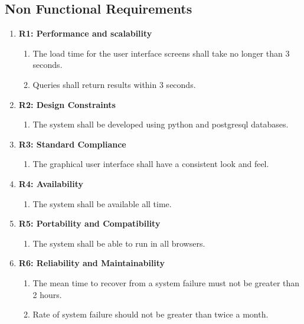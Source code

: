 \subsection{Non Functional Requirements}
\begin{enumerate}[font=\bfseries]
    \item \textbf{R1: Performance and scalability}
          \begin{enumerate}
              \item The load time for the user interface screens shall take no longer than 3 seconds.
              \item Queries shall return results within 3 seconds.
          \end{enumerate}
    \item \textbf{R2: Design Constraints}
          \begin{enumerate}
              \item The system shall be developed using python and postgresql databases.
          \end{enumerate}
    \item \textbf{R3: Standard Compliance}
          \begin{enumerate}
              \item The graphical user interface shall have a consistent look and feel.
          \end{enumerate}
    \item \textbf{R4: Availability}
          \begin{enumerate}
              \item The system shall be available all time.
          \end{enumerate}
    \item \textbf{R5: Portability and Compatibility}
          \begin{enumerate}
              \item The system shall be able to run in all browsers.
          \end{enumerate}
    \item \textbf{R6: Reliability and Maintainability}
          \begin{enumerate}
              \item The mean time to recover from a system failure must not be greater than 2 hours.
              \item Rate of system failure should not be greater than twice a month.
          \end{enumerate}
\end{enumerate}

